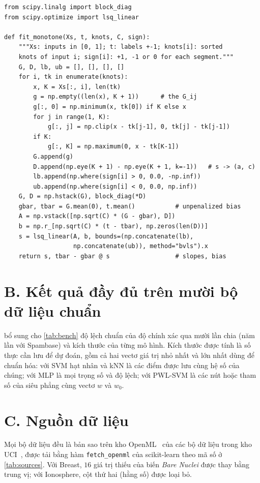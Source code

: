 \begin{lstlisting}
from scipy.linalg import block_diag
from scipy.optimize import lsq_linear

def fit_monotone(Xs, t, knots, C, sign):
    """Xs: inputs in [0, 1]; t: labels +-1; knots[i]: sorted
    knots of input i; sign[i]: +1, -1 or 0 for each segment."""
    G, D, lb, ub = [], [], [], []
    for i, tk in enumerate(knots):
        x, K = Xs[:, i], len(tk)
        g = np.empty((len(x), K + 1))      # the G_ij
        g[:, 0] = np.minimum(x, tk[0]) if K else x
        for j in range(1, K):
            g[:, j] = np.clip(x - tk[j-1], 0, tk[j] - tk[j-1])
        if K:
            g[:, K] = np.maximum(0, x - tk[K-1])
        G.append(g)
        D.append(np.eye(K + 1) - np.eye(K + 1, k=-1))   # s -> (a, c)
        lb.append(np.where(sign[i] > 0, 0.0, -np.inf))
        ub.append(np.where(sign[i] < 0, 0.0, np.inf))
    G, D = np.hstack(G), block_diag(*D)
    gbar, tbar = G.mean(0), t.mean()           # unpenalized bias
    A = np.vstack([np.sqrt(C) * (G - gbar), D])
    b = np.r_[np.sqrt(C) * (t - tbar), np.zeros(len(D))]
    s = lsq_linear(A, b, bounds=(np.concatenate(lb),
                   np.concatenate(ub)), method="bvls").x
    return s, tbar - gbar @ s                  # slopes, bias
\end{lstlisting}

\section*{B. Kết quả đầy đủ trên mười bộ dữ liệu chuẩn}

 bổ sung cho \cref{tab:bench} độ lệch chuẩn của độ chính xác qua mười lần chia (năm lần với Spambase) và kích thước của từng mô hình. Kích thước được tính là số thực cần lưu để dự đoán, gồm cả hai vectơ giá trị nhỏ nhất và lớn nhất dùng để chuẩn hóa: với SVM hạt nhân và kNN là các điểm được lưu cùng hệ số của chúng; với MLP là mọi trọng số và độ lệch; với PWL-SVM là các nút hoặc tham số của siêu phẳng cùng vectơ $w$ và $w_0$.



\section*{C. Nguồn dữ liệu}

Mọi bộ dữ liệu đều là bản sao trên kho OpenML~\cite{vanschoren2013} của các bộ dữ liệu trong kho UCI~\cite{kelly_uci}, được tải bằng hàm \texttt{fetch\_openml} của scikit-learn theo mã số ở \cref{tab:sources}. Với Breast, $16$ giá trị thiếu của biến \emph{Bare Nuclei} được thay bằng trung vị; với Ionosphere, cột thứ hai (hằng số) được loại bỏ.

